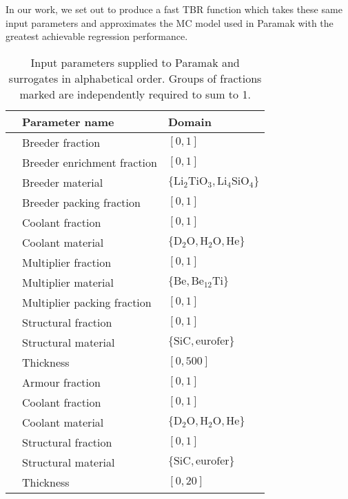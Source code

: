 In our work, we set out to produce a fast TBR function which takes these same
input parameters and approximates the MC model used in Paramak with the
greatest achievable regression performance.

\begin{table}[t]
	\setlength\tabcolsep{2pt}
	\renewcommand{\arraystretch}{0.95}
	\caption{\label{tbl:params}Input parameters supplied to Paramak and surrogates in alphabetical order. Groups of fractions marked\textsuperscript{\textdagger
		\textdaggerdbl} are independently required to sum to 1.}
	\begin{indented}
	\item[]
		\begin{tabular}{l|ll}
		\toprule
		{} & Parameter name & Domain\\
		\midrule
		\parbox[t]{2mm}{\hspace{-2pt}}
		   & Breeder fraction\textsuperscript{\textdagger} & $[0,1]$\\
		   & Breeder  enrichment fraction & $[0,1]$\\
		   & Breeder material & $\{\text{Li}_2\text{TiO}_3, \text{Li}_4\text{SiO}_4\}$\\
		   & Breeder packing fraction & $[0,1]$\\
		   & Coolant fraction\textsuperscript{\textdagger} & $[0,1]$\\
		   & Coolant material & $\{\text{D}_2\text{O}, \text{H}_2\text{O}, \text{He}\}$\\
		   & Multiplier fraction\textsuperscript{\textdagger} & $[0,1]$\\
		   & Multiplier material & $\{\text{Be}, \text{Be}_{12}\text{Ti}\}$\\
		   & Multiplier packing fraction & $[0,1]$\\
		   & Structural fraction\textsuperscript{\textdagger} & $[0,1]$\\
		   & Structural material & $\{\text{SiC}, \text{eurofer}\}$\\
		   & Thickness & $[0,500]$\\
		\midrule
		\parbox[t]{2mm}{\hspace{-2pt}}
		   & Armour fraction\textsuperscript{\textdaggerdbl} & $[0,1]$\\
		   & Coolant fraction\textsuperscript{\textdaggerdbl} & $[0,1]$\\
		   & Coolant material & $\{\text{D}_2\text{O}, \text{H}_2\text{O}, \text{He}\}$\\
		   & Structural fraction\textsuperscript{\textdaggerdbl} & $[0,1]$\\
		   & Structural material & $\{\text{SiC}, \text{eurofer}\}$\\
		   & Thickness & $[0,20]$\\
		\bottomrule
		\end{tabular}
	\end{indented}
\end{table}

